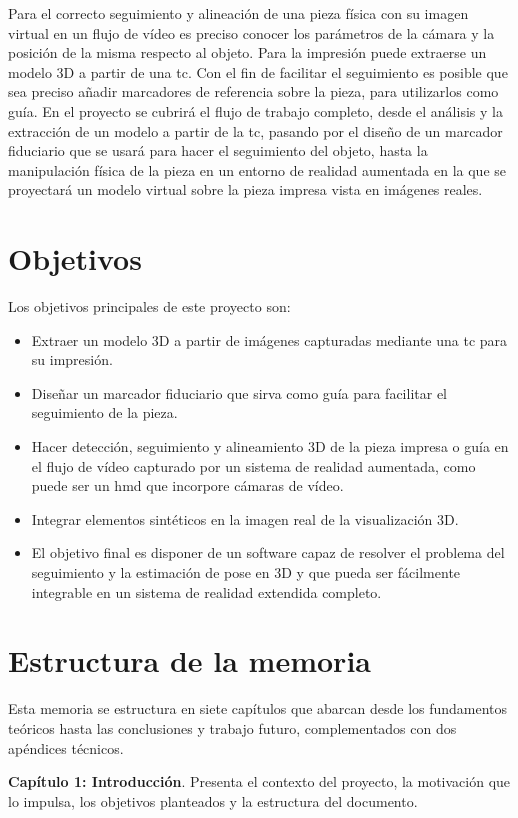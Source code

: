 Para el correcto seguimiento y alineación de una pieza física con su imagen virtual en un flujo de vídeo es preciso conocer los parámetros de la cámara y la posición de la misma respecto al objeto. Para la impresión puede extraerse un modelo 3D a partir de una \gls{tc}. Con el fin de facilitar el seguimiento es posible que sea preciso añadir marcadores de referencia sobre la pieza, para utilizarlos como guía. En el proyecto se cubrirá el flujo de trabajo completo, desde el análisis y la extracción de un modelo a partir de la \gls{tc}, pasando por el diseño de un marcador fiduciario que se usará para hacer el seguimiento del objeto, hasta la manipulación física de la pieza en un entorno de realidad aumentada en la que se proyectará un modelo virtual sobre la pieza impresa vista en imágenes reales.

\section{Objetivos}
Los objetivos principales de este proyecto son:
\begin{itemize}
	\item Extraer un modelo 3D a partir de imágenes capturadas mediante una \gls{tc} para su impresión.
	\item Diseñar un marcador fiduciario que sirva como guía para facilitar el seguimiento de la pieza.
	\item Hacer detección, seguimiento y alineamiento 3D de la pieza impresa o guía en el flujo de vídeo capturado por un sistema de realidad aumentada, como puede ser un \acrshort{hmd} que incorpore cámaras de vídeo.
	\item Integrar elementos sintéticos en la imagen real de la visualización 3D.
	\item El objetivo final es disponer de un software capaz de resolver el problema del seguimiento y la estimación de pose en 3D y que pueda ser fácilmente integrable en un sistema de realidad extendida completo.
\end{itemize}

\section{Estructura de la memoria}

Esta memoria se estructura en siete capítulos que abarcan desde los fundamentos teóricos hasta las conclusiones y trabajo futuro, complementados con dos apéndices técnicos.

\textbf{Capítulo 1: Introducción}. Presenta el contexto del proyecto, la motivación que lo impulsa, los objetivos planteados y la estructura del documento.

